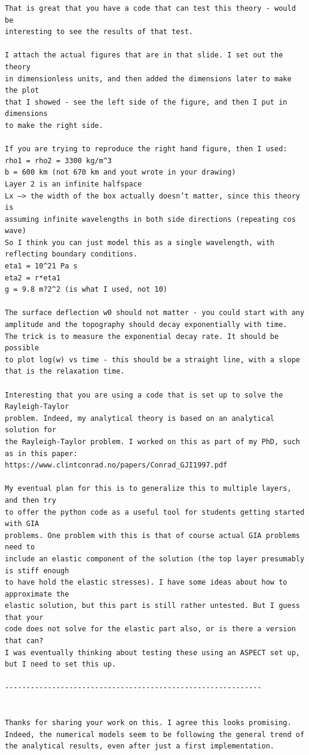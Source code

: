 \begin{verbatim}
That is great that you have a code that can test this theory - would be 
interesting to see the results of that test.

I attach the actual figures that are in that slide. I set out the theory 
in dimensionless units, and then added the dimensions later to make the plot 
that I showed - see the left side of the figure, and then I put in dimensions 
to make the right side.

If you are trying to reproduce the right hand figure, then I used:
rho1 = rho2 = 3300 kg/m^3
b = 600 km (not 670 km and yout wrote in your drawing)
Layer 2 is an infinite halfspace
Lx —> the width of the box actually doesn’t matter, since this theory is 
assuming infinite wavelengths in both side directions (repeating cos wave) 
So I think you can just model this as a single wavelength, with reflecting boundary conditions.
eta1 = 10^21 Pa s
eta2 = r*eta1
g = 9.8 m?2^2 (is what I used, not 10)

The surface deflection w0 should not matter - you could start with any 
amplitude and the topography should decay exponentially with time. 
The trick is to measure the exponential decay rate. It should be possible 
to plot log(w) vs time - this should be a straight line, with a slope that is the relaxation time.

Interesting that you are using a code that is set up to solve the Rayleigh-Taylor 
problem. Indeed, my analytical theory is based on an analytical solution for 
the Rayleigh-Taylor problem. I worked on this as part of my PhD, such as in this paper:
https://www.clintconrad.no/papers/Conrad_GJI1997.pdf

My eventual plan for this is to generalize this to multiple layers, and then try 
to offer the python code as a useful tool for students getting started with GIA 
problems. One problem with this is that of course actual GIA problems need to 
include an elastic component of the solution (the top layer presumably is stiff enough 
to have hold the elastic stresses). I have some ideas about how to approximate the 
elastic solution, but this part is still rather untested. But I guess that your 
code does not solve for the elastic part also, or is there a version that can? 
I was eventually thinking about testing these using an ASPECT set up, but I need to set this up.

------------------------------------------------------------


Thanks for sharing your work on this. I agree this looks promising. 
Indeed, the numerical models seem to be following the general trend of 
the analytical results, even after just a first implementation.


\end{verbatim}
